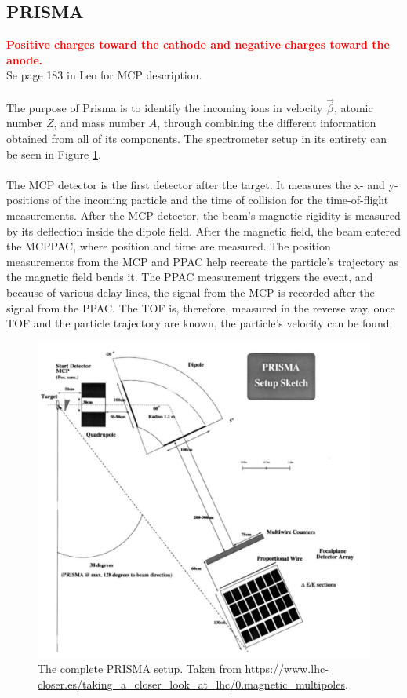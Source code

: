 \documentclass{article}
\begin{document}
\subsection{PRISMA}
\textcolor{red}{\textbf{Positive charges toward the cathode and negative charges toward the anode.}}\\
Se page 183 in Leo for MCP description.
\\\\
The purpose of Prisma is to identify the incoming ions in velocity $\vec{\beta}$, atomic number $Z$, and mass number $A$, through combining the different information obtained from all of  its components.
The spectrometer setup in its entirety can be seen in Figure \ref{fig:SetupPRISMA}.
\\\\ 
The MCP detector is the first detector after the target. It measures the x- and y-positions of the incoming particle and the time of collision for the time-of-flight measurements.
After the MCP detector, the beam's magnetic rigidity is measured by its deflection inside the dipole field. 
After the magnetic field, the beam entered the MCPPAC, where position and time are measured.
The position measurements from the MCP and PPAC help recreate the particle's trajectory as the magnetic field bends it.
The PPAC measurement triggers the event, and because of various delay lines, the signal from the MCP is recorded after the signal from the PPAC. 
The TOF is, therefore, measured in the reverse way.
once TOF and the particle trajectory are known, the particle's velocity can be found.
\begin{figure}[htbp!]
    \centering
    \includegraphics[width=0.9\linewidth]{Figures/PRISMA/PRISMASetup.pdf}
    \caption{The complete PRISMA setup. Taken from \url{https://www.lhc-closer.es/taking_a_closer_look_at_lhc/0.magnetic_multipoles}.}
    \label{fig:SetupPRISMA}
\end{figure}
\end{document}

